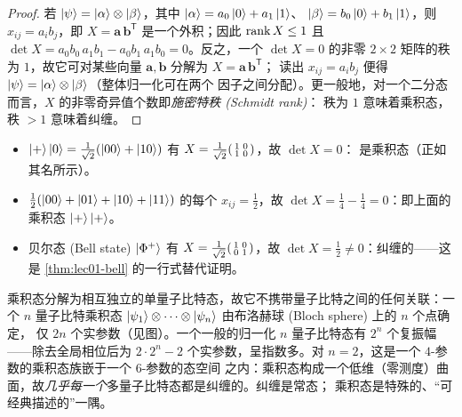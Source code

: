 \begin{proof}
若 $\ket{\psi}=\ket{\alpha}\otimes\ket{\beta}$，其中 $\ket{\alpha}=a_0\ket0+a_1\ket1$、
$\ket{\beta}=b_0\ket0+b_1\ket1$，则 $x_{ij}=a_i b_j$，即
$X=\mathbf{a}\,\mathbf{b}^{\mathsf T}$ 是一个外积；因此 $\operatorname{rank} X\le1$ 且
$\det X=a_0b_0\,a_1b_1-a_0b_1\,a_1b_0=0$。反之，一个 $\det X=0$ 的非零 $2\times2$ 矩阵的秩为
$1$，故它可对某些向量 $\mathbf a,\mathbf b$ 分解为 $X=\mathbf{a}\,\mathbf{b}^{\mathsf T}$；
读出 $x_{ij}=a_ib_j$ 便得 $\ket{\psi}=\ket{\alpha}\otimes\ket{\beta}$（整体归一化可在两个
因子之间分配）。更一般地，对一个二分态而言，$X$ 的非零奇异值个数即\emph{施密特秩 (Schmidt rank)}：
秩为 $1$ 意味着乘积态，秩 $>1$ 意味着纠缠。
\end{proof}

\begin{example}[判据的实际运用]\label{exa:lec01-septest}
\begin{itemize}[nosep,leftmargin=1.4em]
  \item $\ket{+}\ket{0}=\tfrac1{\sqrt2}(\ket{00}+\ket{10})$ 有
        $X=\tfrac1{\sqrt2}\begin{psmallmatrix}1&0\\ 1&0\end{psmallmatrix}$，故 $\det X=0$：
        是乘积态（正如其名所示）。
  \item $\tfrac12(\ket{00}+\ket{01}+\ket{10}+\ket{11})$ 的每个 $x_{ij}=\tfrac12$，故
        $\det X=\tfrac14-\tfrac14=0$：即上面的乘积态 $\ket{+}\ket{+}$。
  \item 贝尔态 (Bell state) $\ket{\Phi^{+}}$ 有
        $X=\tfrac1{\sqrt2}\begin{psmallmatrix}1&0\\ 0&1\end{psmallmatrix}$，故
        $\det X=\tfrac12\neq0$：纠缠的——这是 \cref{thm:lec01-bell} 的一行式替代证明。
\end{itemize}
\end{example}

\begin{remark}\label{rem:lec01-generic-ent}
乘积态分解为相互独立的单量子比特态，故它不携带量子比特之间的任何关联：一个 $n$ 量子比特乘积态
$\ket{\psi_1}\otimes\cdots\otimes\ket{\psi_n}$ 由布洛赫球 (Bloch sphere) 上的 $n$ 个点确定，
仅 $2n$ 个实参数（见图）。一个一般的归一化 $n$ 量子比特态有 $2^{n}$ 个复振幅——除去全局相位后为
$2\cdot2^{n}-2$ 个实参数，呈指数多。对 $n=2$，这是一个 $4$-参数的乘积态族嵌于一个 $6$-参数的态空间
之内：乘积态构成一个低维（零测度）曲面，故\emph{几乎每一个}多量子比特态都是纠缠的。纠缠是常态；
乘积态是特殊的、“可经典描述的”一隅。
\end{remark}

